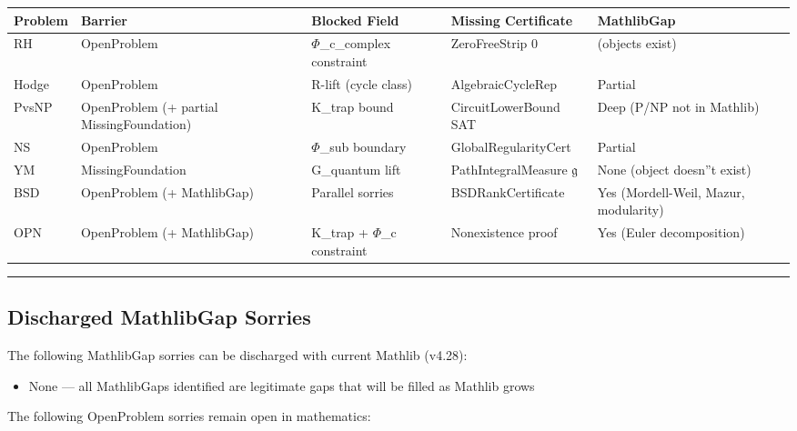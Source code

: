 \documentclass[12pt,a4paper]{article}
\begin{document}
\begin{table}[htbp]
\centering
\small
{}
\begin{tabularx}{\textwidth}{>{\centering\arraybackslash}X >{\centering\arraybackslash}X >{\centering\arraybackslash}X >{\centering\arraybackslash}X >{\centering\arraybackslash}X}
\toprule
\rowcolor{gray!25}\textbf{Problem} & \textbf{Barrier} & \textbf{Blocked Field} & \textbf{Missing Certificate} & \textbf{MathlibGap} \\
\midrule
\rowcolors{1}{white}{gray!10}
RH & OpenProblem & $\Phi$\_c\_complex constraint & ZeroFreeStrip 0 &  (objects exist) \\
Hodge & OpenProblem & R-lift (cycle class) & AlgebraicCycleRep & Partial \\
PvsNP & OpenProblem (+ partial MissingFoundation) & K\_trap bound & CircuitLowerBound SAT & Deep (P/NP not in Mathlib) \\
NS & OpenProblem & $\Phi$\_sub boundary & GlobalRegularityCert & Partial \\
YM & MissingFoundation & G\_quantum lift & PathIntegralMeasure 𝔤 & None (object doesn''t exist) \\
BSD & OpenProblem (+ MathlibGap) & Parallel sorries & BSDRankCertificate & Yes (Mordell-Weil, Mazur, modularity) \\
OPN & OpenProblem (+ MathlibGap) & K\_trap + $\Phi$\_c constraint & Nonexistence proof & Yes (Euler decomposition) \\
\bottomrule
\end{tabularx}
\end{table}

\begin{center}
\rule{0.5\textwidth}{0.4pt}
\end{center}

\subsection{Discharged MathlibGap Sorries}

The following MathlibGap sorries can be discharged with current Mathlib (v4.28):

\begin{itemize}
    \item None --- all MathlibGaps identified are legitimate gaps that will be filled as Mathlib grows
\end{itemize}

The following OpenProblem sorries remain open in mathematics:
\end{document}
